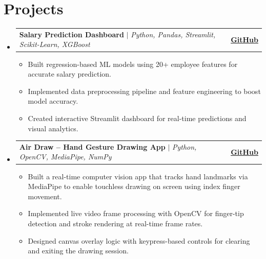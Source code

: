 \documentclass[letterpaper,11pt]{article}
\makeatletter
\newcommand{\resumeItem}[1]{\item\small{#1\vspace{0pt}}}
\newcommand{\resumeProjectHeading}[2]{
    \item
    \begin{tabular*}{1.001\textwidth}{l@{\extracolsep{\fill}}r}
      \small#1 & \textbf{\small #2}\\
    \end{tabular*}\vspace{-5pt}
}
\newcommand{\resumeSubHeadingListStart}{\begin{itemize}[leftmargin=0.0in, label={}]}
\newcommand{\resumeSubHeadingListEnd}{\end{itemize}}
\newcommand{\resumeItemListStart}{\begin{itemize}[leftmargin=0.15in, itemsep=1pt, topsep=2pt]}
\newcommand{\resumeItemListEnd}{\end{itemize}\vspace{-2pt}}
\makeatother
\begin{document}
\section{Projects}
    \vspace{-4pt}
    \resumeSubHeadingListStart
      \resumeProjectHeading
        {\textbf{Salary Prediction Dashboard} $|$ \emph{Python, Pandas, Streamlit, Scikit-Learn, XGBoost}}
        {\href{https://github.com/kunalsaukhiya05/salary-prediction-dashboard}{GitHub}}
        \resumeItemListStart
          \resumeItem{Built regression-based ML models using 20+ employee features for accurate salary prediction.}
          \resumeItem{Implemented data preprocessing pipeline and feature engineering to boost model accuracy.}
          \resumeItem{Created interactive Streamlit dashboard for real-time predictions and visual analytics.}
        \resumeItemListEnd
      \vspace{-2pt}
      \resumeProjectHeading
        {\textbf{Air Draw -- Hand Gesture Drawing App} $|$ \emph{Python, OpenCV, MediaPipe, NumPy}}
        {\href{https://github.com/kunalsaukhiya05/air-draw-opencv}{GitHub}}
        \resumeItemListStart
          \resumeItem{Built a real-time computer vision app that tracks hand landmarks via MediaPipe to enable touchless drawing on screen using index finger movement.}
          \resumeItem{Implemented live video frame processing with OpenCV for finger-tip detection and stroke rendering at real-time frame rates.}
          \resumeItem{Designed canvas overlay logic with keypress-based controls for clearing and exiting the drawing session.}
        \resumeItemListEnd
    \resumeSubHeadingListEnd
    \vspace{-2pt}

\end{document}
